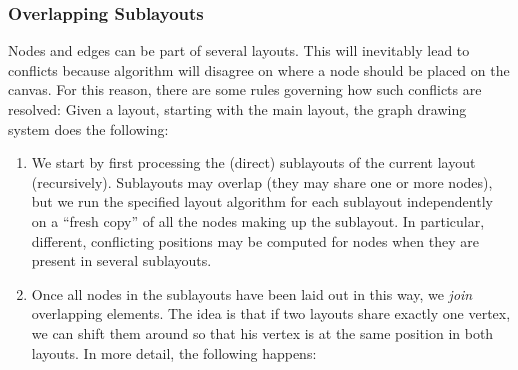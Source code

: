 \subsubsection{Overlapping Sublayouts}
\label{section-gd-layout-resolve}

Nodes and edges can be part of several layouts. This will inevitably lead to
conflicts because algorithm will disagree on where a node should be placed on
the canvas. For this reason, there are some rules governing how such conflicts
are resolved: Given a layout, starting with the main layout, the graph drawing
system does the following:
%
\begin{enumerate}
    \item We start by first processing the (direct) sublayouts of the current
        layout (recursively). Sublayouts may overlap (they may share one or
        more nodes), but we run the specified layout algorithm for each
        sublayout independently on a ``fresh copy'' of all the nodes making up
        the sublayout. In particular, different, conflicting positions may be
        computed for nodes when they are present in several sublayouts.
    \item Once all nodes in the sublayouts have been laid out in this way, we
        \emph{join} overlapping elements. The idea is that if two layouts share
        exactly one vertex, we can shift them around so that his vertex is at
        the same position in both layouts. In more detail, the following
        happens:


\end{enumerate}

